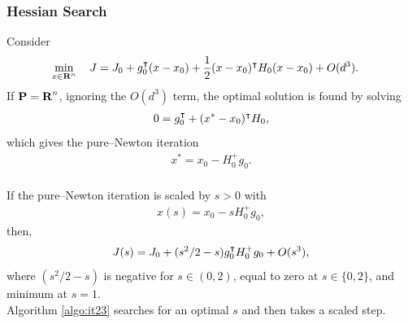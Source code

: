 \documentclass{article}
\begin{document}
\subsubsection{Hessian Search}

    Consider
    \begin{align*}
        \min_{x\in\textbf{R}^n}\quad J&=J_0 + g_0^\intercal(x-x_0)+\frac{1}{2} (x-x_0)^\intercal H_0 (x-x_0)+ O(d^3).
    \end{align*}
    If $\textbf{P}=\textbf{R}^n$, ignoring the $O(d^3)$ term, 
    the optimal solution is found by solving
    \begin{align*}
        0 = g_0^\intercal + (x^*-x_0)^\intercal H_0,
    \end{align*}
    which gives the pure--Newton iteration
    \begin{align*}
        x^*=x_0-H_0^+g_0.
    \end{align*}
    \\
    If the pure--Newton iteration is scaled by $s>0$ with
    \begin{align*}
        x(s)=x_0-sH_0^+g_0,
    \end{align*}
    then,
    \begin{align*}
        J(s) = J_0 +(s^2/2-s)g_0^\intercal H_0^+ g_0+O(s^3),
    \end{align*}
    where $(s^2/2-s)$ is negative for $s\in(0,2)$, 
    equal to zero at $s\in\{0,2\}$, 
    and minimum at $s=1$.\\
    Algorithm \ref{algo:it23} searches for an optimal $s$ and then takes a scaled step.


\clearpage
\end{document}
